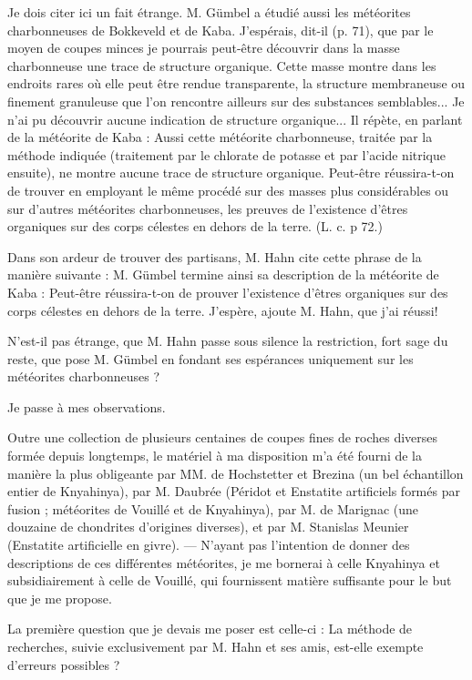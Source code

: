 \documentclass[a4paper, 12pt, oneside, french]{article}
\begin{document}
Je dois citer ici un fait étrange. M. Gümbel a étudié aussi les météorites charbonneuses de Bokkeveld et de Kaba. \og J'espérais, dit-il (p. 71), que par le moyen de coupes minces je pourrais peut-être découvrir dans la masse charbonneuse une trace de structure organique. Cette masse montre dans les endroits rares où elle peut être rendue transparente, la structure membraneuse ou finement granuleuse que l'on rencontre ailleurs sur des substances semblables... \fg \og Je n'ai pu découvrir aucune indication de structure organique... \fg Il répète, en parlant de la météorite de Kaba : \og Aussi cette météorite charbonneuse, traitée par la méthode indiquée (traitement par le chlorate de potasse et par l'acide nitrique ensuite), ne montre aucune trace de structure organique. Peut-être réussira-t-on de trouver en employant le même procédé sur des masses plus considérables ou sur d'autres météorites charbonneuses, les preuves de l'existence d'êtres organiques sur des corps célestes en dehors de la terre. \fg (L. c. p 72.)

Dans son ardeur de trouver des partisans, M. Hahn cite cette phrase de la manière suivante : \og M. Gümbel termine ainsi sa description de la météorite de Kaba : \og Peut-être réussira-t-on de prouver l'existence d'êtres organiques sur des corps célestes en dehors de la terre. \fg J'espère, ajoute M. Hahn, que j'ai réussi! \fg

N'est-il pas étrange, que M. Hahn passe sous silence la restriction, fort sage du reste, que pose M. Gümbel en fondant ses espérances uniquement sur les météorites charbonneuses ?

Je passe à mes observations.

Outre une collection de plusieurs centaines de coupes fines de roches diverses formée depuis longtemps, le matériel à ma disposition m'a été fourni de la manière la plus obligeante par MM. de Hochstetter et Brezina (un bel échantillon entier de Knyahinya), par M. Daubrée (Péridot et Enstatite artificiels formés par fusion ; météorites de Vouillé et de Knyahinya), par M. de Marignac (une douzaine de chondrites d'origines diverses), et par M. Stanislas Meunier (Enstatite artificielle en givre). --- N'ayant pas l'intention de donner des descriptions de ces différentes météorites, je me bornerai à celle Knyahinya et subsidiairement à celle de Vouillé, qui fournissent matière suffisante pour le but que je me propose.

La première question que je devais me poser est celle-ci : La méthode de recherches, suivie exclusivement par M. Hahn et ses amis, est-elle exempte d'erreurs possibles ?
\end{document}
